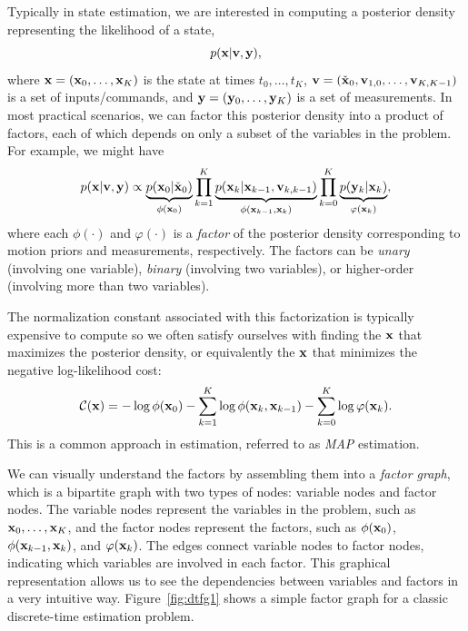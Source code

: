 Typically in state estimation, we are interested in computing a posterior density representing the likelihood of a state,
\begin{equation}
p(\mathbf{x} | \mathbf{v}, \mathbf{y}),
\end{equation}
where $\mathbf{x} = (\mathbf{x}_0, \ldots, \mathbf{x}_K)$ is the state at times $t_0, \ldots, t_K$, $\mathbf{v} = (\check{\mathbf{x}}_0, \mathbf{v}_{1,0}, \ldots, \mathbf{v}_{K,K-1})$ is a set of inputs/commands, and $\mathbf{y} = (\mathbf{y}_0, \ldots, \mathbf{y}_K)$ is a set of measurements.  In most practical scenarios, we can factor this posterior density into a product of factors, each of which depends on only a subset of the variables in the problem.  For example, we might have
\begin{equation}
p(\mathbf{x} | \mathbf{v}, \mathbf{y}) \propto \underbrace{p(\mathbf{x}_0| \check{\mathbf{x}}_0)}_{\phi(\mathbf{x}_0)} \prod_{k=1}^K \underbrace{p(\mathbf{x}_k | \mathbf{x}_{k-1}, \mathbf{v}_{k,k-1})}_{\phi(\mathbf{x}_{k-1},\mathbf{x}_k)} \prod_{k=0}^K \underbrace{p(\mathbf{y}_k | \mathbf{x}_k)}_{\varphi(\mathbf{x}_k)},
\end{equation}
where each $\phi(\cdot)$ and $\varphi(\cdot)$ is a {\em factor} of the posterior density corresponding to motion priors and measurements, respectively.  The factors can be {\em unary} (involving one variable), {\em binary} (involving two variables), or higher-order (involving more than two variables).

The normalization constant associated with this factorization is typically expensive to compute so we often satisfy ourselves with finding the $\mathbf{x}$ that maximizes the posterior density, or equivalently the $\mathbf{x}$ that minimizes the negative log-likelihood cost:
\begin{equation}\label{eq:cost}
\mathcal{C}(\mathbf{x}) = -\log \phi(\mathbf{x}_0) - \sum_{k=1}^K \log \phi(\mathbf{x}_k, \mathbf{x}_{k-1}) - \sum_{k=0}^K \log \varphi(\mathbf{x}_k).
\end{equation}
This is a common approach in estimation, referred to as {\em \ac{MAP}} estimation.

We can visually understand the factors by assembling them into a {\em factor graph}, which is a bipartite graph with two types of nodes: variable nodes and factor nodes.  The variable nodes represent the variables in the problem, such as $\mathbf{x}_0, \ldots, \mathbf{x}_K$, and the factor nodes represent the factors, such as $\phi(\mathbf{x}_0)$, $\phi(\mathbf{x}_{k-1},\mathbf{x}_k)$, and $\varphi(\mathbf{x}_k)$.  The edges connect variable nodes to factor nodes, indicating which variables are involved in each factor.  This graphical representation allows us to see the dependencies between variables and factors in a very intuitive way.  Figure~\ref{fig:dtfg1} shows a simple factor graph for a classic discrete-time estimation problem.

